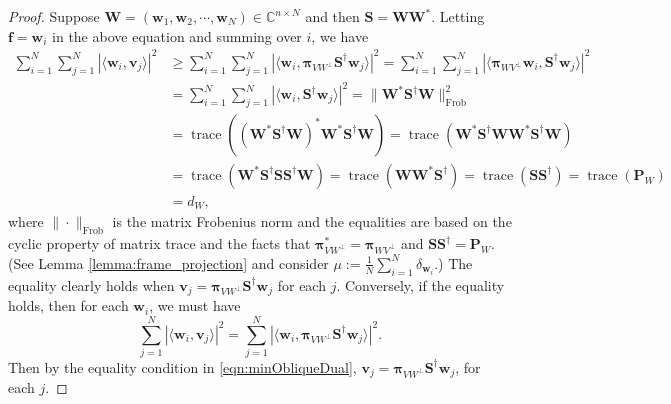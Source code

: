 \documentclass{amsart}
\numberwithin{equation}{section}
\DeclareMathOperator{\trace}{trace}
\newcommand{\bP}{{\mathbf P}}
\newcommand{\bpi}{{\boldsymbol{\pi}}}
\theoremstyle{plain}
\theoremstyle{remark}
\theoremstyle{definition}
\begin{document}
\begin{proof}
Suppose $\mathbf{W} = (\mathbf{w}_1, \mathbf{w}_2, \cdots, \mathbf{w}_N) \in \mathbb{C}^{n \times N}$ and then $\mathbf{S} = \mathbf{W} \mathbf{W}^*$.  Letting $\mathbf{f} = \mathbf{w}_i$ in the above equation and summing over $i$, we have
\begin{equation*}
\begin{split}
    \sum_{i=1}^N \sum_{j=1}^N |\langle \mathbf{w}_i, \mathbf{v}_j \rangle|^2 
    &\geq \sum_{i=1}^N \sum_{j=1}^N |\langle \mathbf{w}_i, \bpi_{VW^\perp} \mathbf{S}^{\dagger} \mathbf{w}_j \rangle|^2 = \sum_{i=1}^N \sum_{j=1}^N |\langle \bpi_{WV^\perp}\mathbf{w}_i, \mathbf{S}^{\dagger} \mathbf{w}_j \rangle|^2\\
    & = \sum_{i=1}^N \sum_{j=1}^N |\langle \mathbf{w}_i, \mathbf{S}^{\dagger} \mathbf{w}_j \rangle|^2 = \|\mathbf{W}^*\mathbf{S}^{\dagger}\mathbf{W}\|_{\text{Frob}}^2 \\
    &=\trace((\mathbf{W}^*\mathbf{S}^{\dagger}\mathbf{W})^*\mathbf{W}^*\mathbf{S}^{\dagger}\mathbf{W}) = \trace(\mathbf{W}^*\mathbf{S}^{\dagger}\mathbf{W}\mathbf{W}^*\mathbf{S}^{\dagger}\mathbf{W})\\
    &= \trace(\mathbf{W}^*\mathbf{S}^{\dagger}\mathbf{S}\mathbf{S}^{\dagger}\mathbf{W}) = \trace(\mathbf{W}\mathbf{W}^*\mathbf{S}^{\dagger}) =\trace(\mathbf{S}\mathbf{S}^{\dagger}) = \trace(\bP_W) \\
    &= d_W,
\end{split}
\end{equation*}
where $\|\cdot\|_{\text{Frob}}$ is the matrix Frobenius norm and the equalities are based on the cyclic property of matrix trace and the facts that $\bpi_{VW^\perp}^* = \bpi_{WV^\perp}$ and $\mathbf{S}\mathbf{S}^{\dagger} = \bP_W$. (See Lemma \ref{lemma:frame_projection} and consider $\mu := \frac{1}{N} \sum_{i=1}^N \delta_{\mathbf{w}_i}$.) 
The equality clearly holds when $\mathbf{v}_j = \bpi_{VW^\perp} \mathbf{S}^{\dagger} \mathbf{w}_j$ for each $j$. Conversely,  if the equality holds, then for each $\mathbf{w}_i$, we must have 
\begin{equation*}
    \sum_{j=1}^N |\langle \mathbf{w}_i, \mathbf{v}_j \rangle|^2 = \sum_{j=1}^N |\langle \mathbf{w}_i, \bpi_{VW^\perp} \mathbf{S}^{\dagger} \mathbf{w}_j \rangle|^2.
\end{equation*}
Then by the equality condition in \cref{eqn:minObliqueDual}, $\mathbf{v}_j = \bpi_{VW^\perp} \mathbf{S}^{\dagger} \mathbf{w}_j$, for each $j$.
\end{proof}
\end{document}
